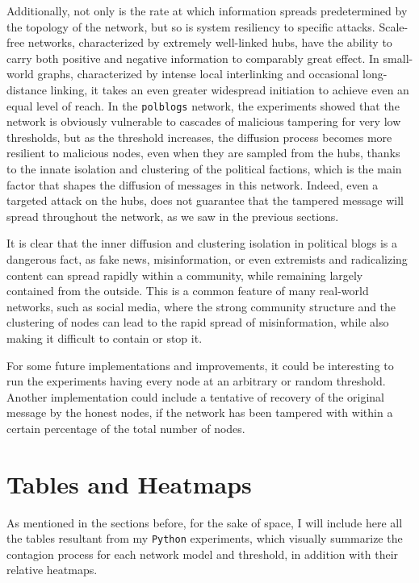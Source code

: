 \documentclass{article}
\begin{document}
Additionally, not only is the rate at which information spreads predetermined by the topology of the network, but so is system resiliency to specific attacks. 
Scale-free networks, characterized by extremely well-linked hubs, have the ability to carry both positive and negative information to comparably great effect. 
In small-world graphs, characterized by intense local interlinking and occasional long-distance linking, it takes an even greater widespread initiation to achieve even an equal level of reach. 
In the \texttt{polblogs} network, the experiments showed that the network is obviously vulnerable to cascades of malicious tampering for very low thresholds, but as the threshold increases, the diffusion process becomes more resilient to malicious nodes, even when they are sampled from the hubs, thanks to the innate isolation and clustering of the political factions, which is the main factor that shapes the diffusion of messages in this network.
Indeed, even a targeted attack on the hubs, does not guarantee that the tampered message will spread throughout the network, as we saw in the previous sections.

It is clear that the inner diffusion and clustering isolation in political blogs is a dangerous fact, as fake news, misinformation, or even extremists and radicalizing content can spread rapidly within a community, while remaining largely contained from the outside.
This is a common feature of many real-world networks, such as social media, where the strong community structure and the clustering of nodes can lead to the rapid spread of misinformation, while also making it difficult to contain or stop it.

For some future implementations and improvements, it could be interesting to run the experiments having every node at an arbitrary or random threshold. Another implementation could include a tentative of recovery of the original message by the honest nodes, if the network has been tampered with within a certain percentage of the total number of nodes.


\appendix
\section{Tables and Heatmaps}
As mentioned in the sections before, for the sake of space, I will include here all the tables resultant from my \texttt{Python} experiments, which visually summarize the contagion process for each network model and threshold, in addition with their relative heatmaps.
\end{document}
